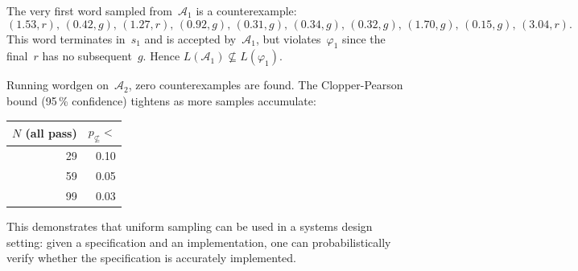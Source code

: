 \begin{example}
  The very first word sampled from~$\mathcal{A}_1$ is a counterexample:
  \[
    (1.53,r),\,(0.42,g),\,(1.27,r),\,(0.92,g),\,(0.31,g),\,(0.34,g),\,(0.32,g),\,(1.70,g),\,(0.15,g),\,(3.04,r).
  \]
  This word terminates in~$s_1$ and is accepted by~$\mathcal{A}_1$,
  but violates~$\varphi_1$ since the final~$r$ has no subsequent~$g$.
  Hence $L(\mathcal{A}_1)\not\subseteq L(\varphi_1)$.
  
  Running \textsf{wordgen} on~$\mathcal{A}_2$, zero counterexamples are found.
  The Clopper-Pearson bound (95\,\% confidence) tightens as more samples accumulate:
  
  \begin{center}
  \begin{tabular}{rr}
  $N$ (all pass) & $p_{\not\subseteq} <$ \\\hline
  29  & 0.10 \\
  59  & 0.05 \\
  99  & 0.03 \\
  \end{tabular}
  \end{center}
  
  This demonstrates that 
  uniform sampling can be used in a systems design setting: given a specification and an implementation, one can probabilistically verify whether the specification is accurately implemented. 
  \end{example}
  
  